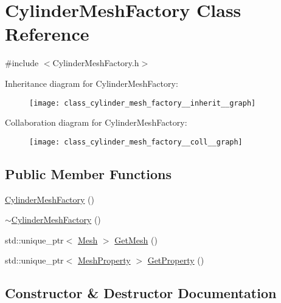 \hypertarget{class_cylinder_mesh_factory}{}\section{Cylinder\+Mesh\+Factory Class Reference}
\label{class_cylinder_mesh_factory}


{\ttfamily \#include $<$Cylinder\+Mesh\+Factory.\+h$>$}



Inheritance diagram for Cylinder\+Mesh\+Factory\+:\nopagebreak
\begin{figure}[H]
\begin{center}
\leavevmode
\texttt{[image: class\_cylinder\_mesh\_factory\_\_inherit\_\_graph]}
\end{center}
\end{figure}


Collaboration diagram for Cylinder\+Mesh\+Factory\+:\nopagebreak
\begin{figure}[H]
\begin{center}
\leavevmode
\texttt{[image: class\_cylinder\_mesh\_factory\_\_coll\_\_graph]}
\end{center}
\end{figure}
\subsection*{Public Member Functions}
\begin{DoxyCompactItemize}
\item 
\mbox{\hyperlink{class_cylinder_mesh_factory_a9550de96c955d3241fec9c41bab43a24}{Cylinder\+Mesh\+Factory}} ()
\item 
\mbox{\hyperlink{class_cylinder_mesh_factory_ad7182f0fb1217b9d9ab5270f10ebb007}{$\sim$\+Cylinder\+Mesh\+Factory}} ()
\item 
std\+::unique\+\_\+ptr$<$ \mbox{\hyperlink{class_mesh}{Mesh}} $>$ \mbox{\hyperlink{class_cylinder_mesh_factory_a6693199a1ec7dc082b56be29213b97d2}{Get\+Mesh}} ()
\item 
std\+::unique\+\_\+ptr$<$ \mbox{\hyperlink{class_mesh_property}{Mesh\+Property}} $>$ \mbox{\hyperlink{class_cylinder_mesh_factory_a3fa17fc0e14db4007c9c2a6cdeb1d8fa}{Get\+Property}} ()
\end{DoxyCompactItemize}


\subsection{Constructor \& Destructor Documentation}
\mbox{\label{class_cylinder_mesh_factory_a9550de96c955d3241fec9c41bab43a24}} 
